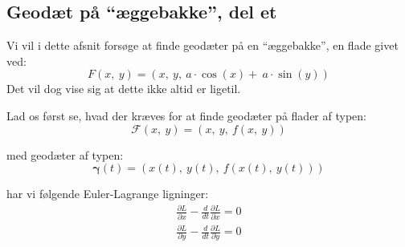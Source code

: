 \newcommand\ddiff[1]{\ddot{#1}}
\newcommand\diff[1]{\dot{#1}}

\subsection{ Geodæt på ``æggebakke'', del et }
Vi vil i dette afsnit forsøge at finde geodæter på en ``æggebakke'',
en flade givet ved:
\begin{equation}\label{eq:aeggebakke}
F(x,~y) = (x,~y,~a \cdot \cos(x)+~a \cdot \sin(y))
\end{equation}
Det vil dog vise sig at dette ikke altid er ligetil.

Lad os først se, hvad der kræves for at finde geodæter på flader af typen:
\begin{equation*}
\mathscr{F}(x,~y) = (x,~y,~f(x,~y))
\end{equation*}

med geodæter af typen:
\begin{equation} \label{eq:geodFlade}
\pmb{\gamma}(t) = (x(t),~y(t),~f(x(t),~y(t)))
\end{equation}

har vi følgende Euler-Lagrange ligninger:
\begin{equation*}
\begin{gathered}
\frac{\partial L}{\partial x} - \frac{d}{dt}\frac{\partial L}{\partial \diff{x}} = 0\\
\frac{\partial L}{\partial y} - \frac{d}{dt}\frac{\partial L}{\partial \diff{y}} = 0
\end{gathered}
\end{equation*}

